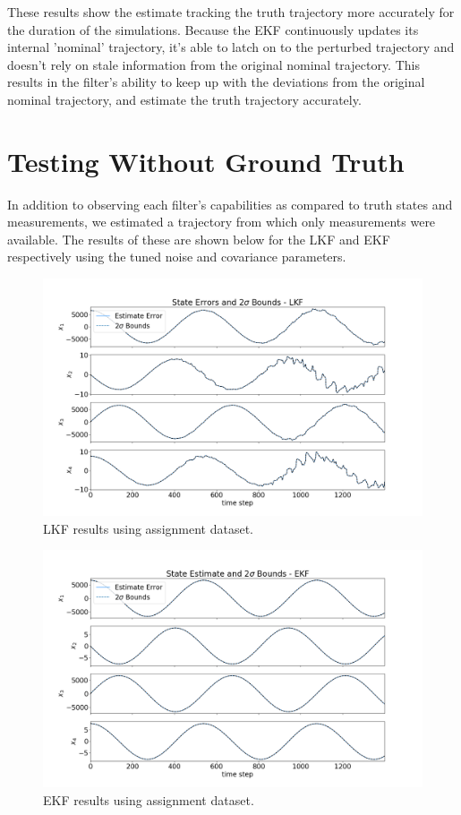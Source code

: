 \documentclass[11pt, a4paper]{article}
\begin{document}
These results show the estimate tracking the truth trajectory more accurately for the duration of the simulations. 
Because the EKF continuously updates its internal 'nominal' trajectory, it's able to latch on to the perturbed trajectory and doesn't rely on stale information from the original nominal trajectory. 
This results in the filter's ability to keep up with the deviations from the original nominal trajectory, and estimate the truth trajectory accurately.


\section{Testing Without Ground Truth}
In addition to observing each filter's capabilities as compared to truth states and measurements, we estimated a trajectory from which only measurements were available. 
The results of these  are shown below for the LKF and EKF respectively using the tuned noise and covariance parameters. 
\begin{figure}[H]
	\centering
	\includegraphics[width=\textwidth]{Figures/lkf_dataste_est.png}
	\caption{LKF results using assignment dataset.}
	\label{fig:lkf_dataset}
\end{figure}

\begin{figure}[H]
	\centering
	\includegraphics[width=\textwidth]{Figures/ekf_dataset_est.png}
	\caption{EKF results using assignment dataset.}
	\label{fig:ekf_dataset}
\end{figure}
\end{document}

